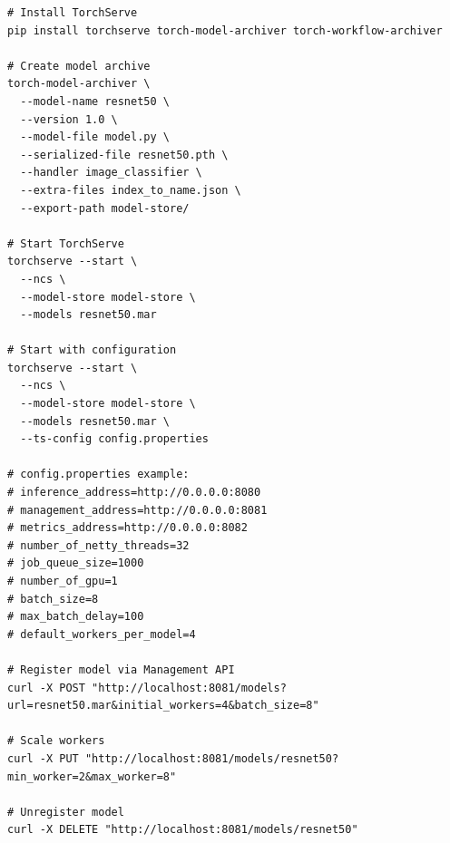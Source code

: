 \begin{lstlisting}[style=shell, caption=TorchServe deployment]
# Install TorchServe
pip install torchserve torch-model-archiver torch-workflow-archiver

# Create model archive
torch-model-archiver \
  --model-name resnet50 \
  --version 1.0 \
  --model-file model.py \
  --serialized-file resnet50.pth \
  --handler image_classifier \
  --extra-files index_to_name.json \
  --export-path model-store/

# Start TorchServe
torchserve --start \
  --ncs \
  --model-store model-store \
  --models resnet50.mar

# Start with configuration
torchserve --start \
  --ncs \
  --model-store model-store \
  --models resnet50.mar \
  --ts-config config.properties

# config.properties example:
# inference_address=http://0.0.0.0:8080
# management_address=http://0.0.0.0:8081
# metrics_address=http://0.0.0.0:8082
# number_of_netty_threads=32
# job_queue_size=1000
# number_of_gpu=1
# batch_size=8
# max_batch_delay=100
# default_workers_per_model=4

# Register model via Management API
curl -X POST "http://localhost:8081/models?url=resnet50.mar&initial_workers=4&batch_size=8"

# Scale workers
curl -X PUT "http://localhost:8081/models/resnet50?min_worker=2&max_worker=8"

# Unregister model
curl -X DELETE "http://localhost:8081/models/resnet50"
\end{lstlisting}

